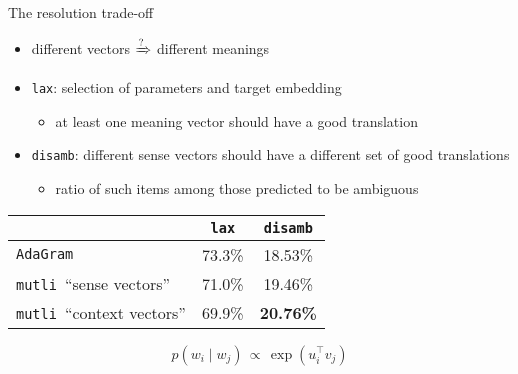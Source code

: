 \documentclass[10pt]{beamer}%
\newcommand{\bull}[1]{\begin{itemize}\item #1 \end{itemize}}
\newcommand{\adagram}{\texttt{AdaGram}}
\newcommand{\mutli}{\texttt{mutli}}
\newcommand{\any}{\texttt{lax}}
\newcommand{\disamb}{\texttt{disamb}}
\begin{document}
\begin{frame}{The resolution trade-off}
  \begin{itemize}
    \item different vectors $ \xRightarrow ? $ different meanings
    \item \any: selection of parameters and target embedding
      \bull{at least one meaning vector should have a good translation}
    \item \disamb: different sense vectors should have a different set of good
      translations
        \bull{ratio of such items among those predicted to be ambiguous}
  \end{itemize}
      \begin{table}[allowframebreaks]
        \begin{tabular}{lcc}
          \toprule
                                    & \any     & \disamb \\
          \midrule
          \adagram                  & 73.3\%  & 18.53\% \\
          \mutli~``sense vectors''  & 71.0\%  & 19.46\% \\
          \mutli~``context vectors''& 69.9\%  & {\bf 20.76\%} \\
          \bottomrule
        \end{tabular}
      \end{table}
      \[p(w_i\mid w_j) \, \propto \, \exp (u_i ^\top v_j)\]
\end{frame}
\end{document}
